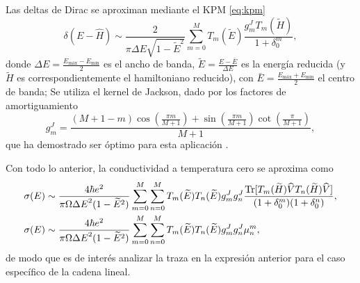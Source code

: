 Las deltas de Dirac se aproximan mediante el KPM \eqref{eq:kpm}
\begin{equation}\label{eq:diracDeltaKPM}
	\delta(E - \widehat{H}) \sim \frac{2}{\pi \Delta E \sqrt{1 - \widetilde{E}^2}} \sum_{m=0}^{M} T_m(\widetilde{E}) \frac{g^J_m T_m(\widetilde{H})}{1 + \delta^m_0},
\end{equation}
donde 
	$\Delta E = \frac{E_{\mathrm{máx}} - E_{\mathrm{mín}}}{2}$
es el ancho de banda, 
	$\widetilde{E} = \frac{E - \bar{E}}{\Delta E}$ 
es la energía reducida (y $\widetilde{H}$ es correspondientemente el hamiltoniano reducido), con $\bar{E} = \frac{E_{\mathrm{máx}} + E_{\mathrm{mín}}}{2}$ el centro de banda;
Se utiliza el kernel de Jackson, dado por los factores de amortiguamiento
\begin{equation}\label{eq:jacksonKernel}
	g_m^J = \frac{(M + 1 - m)\cos(\frac{\pi m}{M + 1}) + \sin(\frac{\pi m}{M + 1})\cot(\frac{\pi}{M + 1})}{M + 1},
\end{equation}
que ha demostrado ser óptimo para esta aplicación \autocite{Weise2006}.

Con todo lo anterior, la conductividad a temperatura cero se aproxima como
\begin{equation}\label{eq:KGapprox}
	\begin{aligned}
		\sigma(E) &\sim \frac{4\hbar e^2}{\pi\Omega{\Delta E}^2(1 - \widetilde{E}^2)} \sum_{m=0}^{M} \sum_{n=0}^{M} T_m(\widetilde{E})T_n(\widetilde{E}) g^J_m g^J_n \frac{\Trace[T_m(\widetilde{H})\widehat{V}T_n(\widetilde{H})\widehat{V}]}{(1 + \delta^m_0) (1 + \delta^n_0)}, \\ 
		\sigma(E) &\sim \frac{4\hbar e^2}{\pi\Omega{\Delta E}^2(1 - \widetilde{E}^2)} \sum_{m=0}^{M} \sum_{n=0}^{M} T_m(\widetilde{E})T_n(\widetilde{E}) g^J_m g^J_n \mu^m_n,
	\end{aligned}
\end{equation}
de modo que es de interés analizar la traza en la expresión anterior para el caso específico de la cadena lineal.


